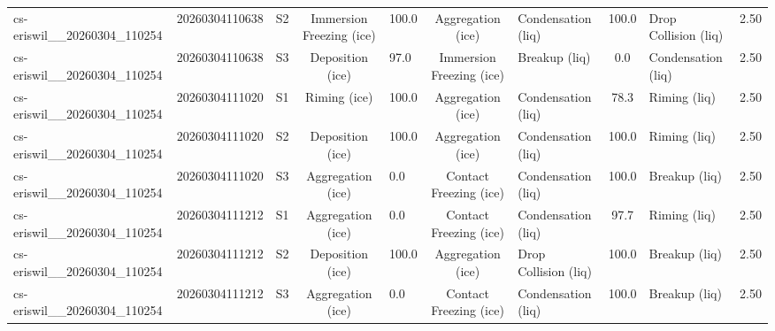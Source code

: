 \begin{table}[t]
{\begin{tabular}{lrlclclclc}
cs-eriswil\_\_20260304\_110254 & 20260304110638 & S2 & Immersion Freezing (ice) & 100.0 & Aggregation (ice) & Condensation (liq) & 100.0 & Drop Collision (liq) & 2.50 \\
cs-eriswil\_\_20260304\_110254 & 20260304110638 & S3 & Deposition (ice) & 97.0 & Immersion Freezing (ice) & Breakup (liq) & 0.0 & Condensation (liq) & 2.50 \\
cs-eriswil\_\_20260304\_110254 & 20260304111020 & S1 & Riming (ice) & 100.0 & Aggregation (ice) & Condensation (liq) & 78.3 & Riming (liq) & 2.50 \\
cs-eriswil\_\_20260304\_110254 & 20260304111020 & S2 & Deposition (ice) & 100.0 & Aggregation (ice) & Condensation (liq) & 100.0 & Riming (liq) & 2.50 \\
cs-eriswil\_\_20260304\_110254 & 20260304111020 & S3 & Aggregation (ice) & 0.0 & Contact Freezing (ice) & Condensation (liq) & 100.0 & Breakup (liq) & 2.50 \\
cs-eriswil\_\_20260304\_110254 & 20260304111212 & S1 & Aggregation (ice) & 0.0 & Contact Freezing (ice) & Condensation (liq) & 97.7 & Riming (liq) & 2.50 \\
cs-eriswil\_\_20260304\_110254 & 20260304111212 & S2 & Deposition (ice) & 100.0 & Aggregation (ice) & Drop Collision (liq) & 100.0 & Breakup (liq) & 2.50 \\
cs-eriswil\_\_20260304\_110254 & 20260304111212 & S3 & Aggregation (ice) & 0.0 & Contact Freezing (ice) & Condensation (liq) & 100.0 & Breakup (liq) & 2.50 \\
\hline
\end{tabular}
}
\end{table}
